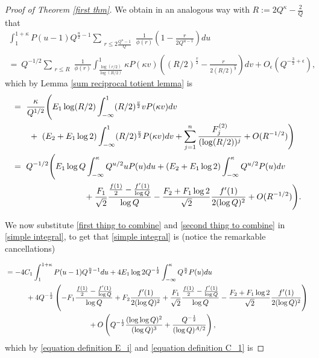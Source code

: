 \documentclass[12pt,reqno]{amsart}
\numberwithin{equation}{section}
\theoremstyle{plain}
\begin{document}
\begin{proof}[Proof of Theorem \ref{first thm}]
We obtain in an analogous way with $R:=2 Q^{\kappa}- \frac 2{Q}$ that
\begin{multline}
 \int_1^{1+\kappa} P(u-1) Q^{\frac u2-1}\sum_{\substack{r\leq 2\frac {Q^u-1}{Q}}}\frac 1{\phi(r)} \left(1-\frac r{2Q^{u-1}}\right)du \\
=\ Q^{-1/2}\sum_{\substack{r\leq R }}\frac 1{\phi(r)} \int_{\frac{\log (r/2) }{\log (R/2)}}^{1} \kappa P(\kappa v)\left((R/2)^{\frac v2}-\frac r{2(R/2)^{\frac v2}}\right)dv + O_{\epsilon}(Q^{-\frac 32+\epsilon}),
\end{multline}
which by Lemma \ref{sum reciprocal totient lemma} is
\begin{align}  &=\ \frac{\kappa}{Q^{1/2}} \Bigg(E_1 \log (R/2)  \int_{-\infty}^1 (R/2)^{\frac v2}vP(\kappa v)dv \notag \\
&\ \ \ \ \ \ +\ (E_2+E_1\log 2) \int_{-\infty}^1 (R/2)^{\frac v2}P(\kappa v)dv  \notag
+ \sum_{j=1}^n \frac{F_j^{(2)}}{(\log (R/2))^j}  + O(R^{-1/2})\Bigg) \\
&=\ Q^{-1/2} \Bigg( E_1 \log Q  \int_{-\infty}^{\kappa} Q^{u/2}uP(u)du
+ (E_2 +E_1\log 2)\int_{-\infty}^{\kappa} Q^{u/2}P(u)dv \notag \\
&\hspace{3cm}+ \frac{F_1}{\sqrt 2}\frac{\frac{f(1)}2-\frac{f'(1)}{\log Q}}{\log Q}-\frac{F_2+F_1\log 2}{\sqrt 2}\frac{f'(1)}{2(\log Q)^2}  + O(R^{-1/2})\Bigg).
\label{second thing to combine}
\end{align}

We now substitute \eqref{first thing to combine} and \eqref{second thing to combine} in \eqref{simple integral}, to get that \eqref{simple integral} is (notice the remarkable cancellations)

\begin{align} &=  -4C_1 \int_1^{1+\kappa} P(u-1)Q^{\frac u2-1}du +4E_1\log 2 Q^{-\frac 12}\int_{-\infty}^{\kappa} Q^{\frac u2} P(u)du    \notag \\
&\hspace{1cm}+4Q^{-\frac 12}\left(- F_1\frac{\frac{f(1)}2-\frac{f'(1)}{\log Q}}{\log Q}+F_2\frac{f'(1)}{2(\log Q)^2} + \frac{F_1}{\sqrt 2}\frac{\frac{f(1)}2-\frac{f'(1)}{\log Q}}{\log Q}-\frac{F_2+F_1\log 2}{\sqrt 2}\frac{f'(1)}{2(\log Q)^2}\right) \notag \\
&\hspace{4cm}+O\left( Q^{-\frac 12}\frac {(\log\log Q)^2}{(\log Q)^3} + \frac{Q^{-\frac 12}}{(\log Q)^{A/2}} \right),\notag
\end{align}
which by \eqref{equation definition E_i} and \eqref{equation definition C_1} is


\end{proof}
\end{document}
